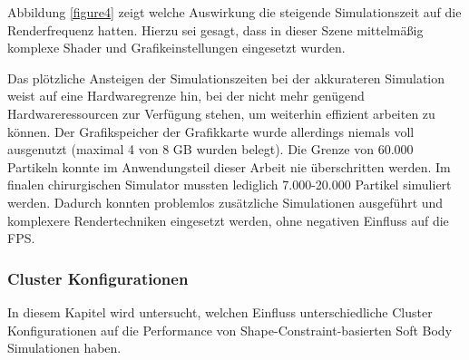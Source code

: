 Abbildung \ref{figure4} zeigt welche Auswirkung die steigende Simulationszeit auf die Renderfrequenz hatten. Hierzu sei gesagt, dass in dieser Szene mittelmäßig komplexe Shader und Grafikeinstellungen eingesetzt wurden.


Das plötzliche Ansteigen der Simulationszeiten bei der akkurateren Simulation weist auf eine Hardwaregrenze hin, bei der nicht mehr genügend Hardwareressourcen zur Verfügung stehen, um weiterhin effizient arbeiten zu können. Der Grafikspeicher der Grafikkarte wurde allerdings niemals voll ausgenutzt (maximal 4 von 8 GB wurden belegt). 
Die Grenze von 60.000 Partikeln konnte im Anwendungsteil dieser Arbeit nie überschritten werden. Im finalen chirurgischen Simulator mussten lediglich 7.000-20.000 Partikel simuliert werden. Dadurch konnten problemlos zusätzliche Simulationen ausgeführt und komplexere Rendertechniken eingesetzt werden, ohne negativen Einfluss auf die FPS.






\subsubsection{Cluster Konfigurationen}




In diesem Kapitel wird untersucht, welchen Einfluss unterschiedliche Cluster Konfigurationen auf die Performance von Shape-Constraint-basierten Soft Body Simulationen haben. 

